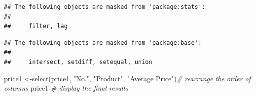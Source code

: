 \documentclass[
  landscape]{article}
\newenvironment{Shaded}{\begin{snugshade}}{\end{snugshade}}
\newcommand{\CommentTok}[1]{\textcolor[rgb]{0.56,0.35,0.01}{\textit{#1}}}
\newcommand{\FunctionTok}[1]{\textcolor[rgb]{0.00,0.00,0.00}{#1}}
\newcommand{\NormalTok}[1]{#1}
\newcommand{\OtherTok}[1]{\textcolor[rgb]{0.56,0.35,0.01}{#1}}
\newcommand{\StringTok}[1]{\textcolor[rgb]{0.31,0.60,0.02}{#1}}
\begin{document}
\begin{verbatim}
## The following objects are masked from 'package:stats':
## 
##     filter, lag
\end{verbatim}

\begin{verbatim}
## The following objects are masked from 'package:base':
## 
##     intersect, setdiff, setequal, union
\end{verbatim}

\begin{Shaded}
\begin{Highlighting}[]
\NormalTok{price1 }\OtherTok{\textless{}{-}}\FunctionTok{select}\NormalTok{(price1, }\StringTok{"No."}\NormalTok{, }\StringTok{"Product"}\NormalTok{, }\StringTok{"Average Price"}\NormalTok{)}\CommentTok{\# rearrange the order of columns}
\NormalTok{price1 }\CommentTok{\# display the final results}
\end{Highlighting}
\end{Shaded}
\end{document}
